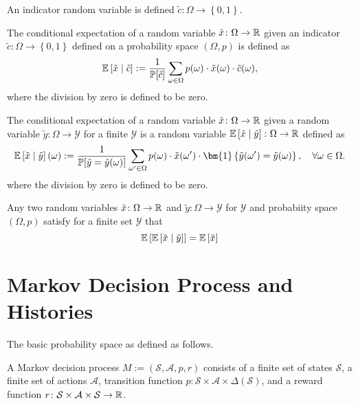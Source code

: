 \begin{definition}
  An indicator random variable is defined $\tilde{c}\colon  \Omega \to \left\{ 0, 1 \right\}$.
  \leanok
\end{definition}

\begin{definition}
  The conditional expectation of a random variable $\tilde{x} \colon \Omega \to \mathbb{R}$ given an indicator $\tilde{c} \colon \Omega \to  \left\{ 0, 1  \right\}$ defined on a probability space $(\Omega, p)$ is defined as
  \[
    \mathbb{E} \left[ \tilde{x} \mid  \tilde{c} \right] := \frac{1}{\mathbb{P}[\tilde{c}]} \sum_{\omega \in \Omega } p(\omega ) \cdot \tilde{x}(\omega) \cdot \tilde{c}(\omega),
  \]
  where the division by zero is defined to be zero.
  \leanok
\end{definition}

\begin{definition}
  The conditional expectation of a random variable $\tilde{x} \colon \Omega \to \mathbb{R}$ given a random variable $\tilde{y} \colon \Omega \to \mathcal{Y}$ for a finite $\mathcal{Y}$ is a random variable $\mathbb{E} \left[ \tilde{x} \mid  \tilde{y} \right]\colon \Omega \to \mathbb{R}$  defined as
  \[
    \E \left[ \tilde{x} \mid  \tilde{y} \right](\omega) := \frac{1}{\P[\tilde{y} = \tilde{y}(\omega)]} \sum_{\omega' \in \Omega } p(\omega) \cdot \tilde{x}(\omega') \cdot \bm{1}\left\{ \tilde{y}(\omega') = \tilde{y}(\omega) \right\}, \quad \forall \omega \in \Omega.
  \]
  where the division by zero is defined to be zero.
  \leanok
\end{definition}

\begin{theorem}
Any two random variables $\tilde{x} \colon \Omega \to \mathbb{R}$ and $\tilde{y} \colon \Omega \to \mathcal{Y} $ for $\mathcal{Y}$ and probabiity space $(\Omega, p)$ satisfy for a finite set $\mathcal{Y}$ that
  \[
   \mathbb{E}\left[\mathbb{E}\left[\tilde{x} \mid  \tilde{y}\right]\right] = \mathbb{E} \left[ \tilde{x} \right] 
  \]
\end{theorem}


\section{Markov Decision Process and Histories}

The basic probability space as defined as follows.
\begin{definition}
  A Markov decision process $M := (\mathcal{S}, \mathcal{A}, p, r)$ consists of a finite set of states $\mathcal{S}$, a finite set of actions $\mathcal{A}$, transition function $p\colon \mathcal{S} \times \mathcal{A} \times \Delta(\mathcal{S})$, and a reward function $r \colon \mathcal{S} \times \mathcal{A} \times \mathcal{S} \to \mathbb{R}$.
  \leanok
\end{definition}

